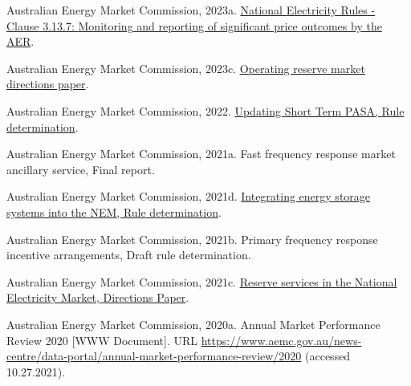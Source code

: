 \documentclass[12pt,a4paper,]{report}
\newlength{\cslhangindent}
\newenvironment{CSLReferences}[2] %
 {%
  \setlength{\parindent}{0pt}
  \ifodd #1 \everypar{\setlength{\hangindent}{\cslhangindent}}\ignorespaces\fi
  \ifnum #2 > 0
  \setlength{\parskip}{#2\baselineskip}
  \fi
 }%
 {}
\begin{document}
\begin{CSLReferences}{1}{0}
\leavevmode{}%
Australian Energy Market Commission, 2023a.
\href{https://energy-rules.aemc.gov.au/ner/477/272353\#3.13.7}{National
{Electricity Rules} - {Clause} 3.13.7: {Monitoring} and reporting of
significant price outcomes by the {AER}}.

\leavevmode{}%
Australian Energy Market Commission, 2023c.
\href{https://www.aemc.gov.au/sites/default/files/2023-08/directions_paper_2023_0.pdf}{Operating
reserve market directions paper}.

\leavevmode{}%
Australian Energy Market Commission, 2022.
\href{https://www.aemc.gov.au/sites/default/files/2022-05/ERC0332\%20-\%20Updating\%20Short\%20Term\%20PASA\%20-\%20Final\%20determination.pdf}{Updating
{Short Term PASA}, {Rule} determination}.

\leavevmode{}%
Australian Energy Market Commission, 2021a. Fast frequency response
market ancillary service, {Final} report.

\leavevmode{}%
Australian Energy Market Commission, 2021d.
\href{https://www.aemc.gov.au/sites/default/files/2021-12/1._final_determination_-_integrating_energy_storage_systems_into_the_nem.pdf}{Integrating
energy storage systems into the {NEM}, {Rule} determination}.

\leavevmode{}%
Australian Energy Market Commission, 2021b. Primary frequency response
incentive arrangements, {Draft} rule determination.

\leavevmode{}%
Australian Energy Market Commission, 2021c.
\href{https://www.aemc.gov.au/sites/default/files/2021-01/Reserve\%20services\%20directions\%20paper\%20-\%205.01.2021\%20-\%20FINAL.pdf}{Reserve
services in the {National Electricity Market}, {Directions Paper}}.

\leavevmode{}%
Australian Energy Market Commission, 2020a. Annual {Market Performance
Review} 2020 {[}WWW Document{]}. URL
\url{https://www.aemc.gov.au/news-centre/data-portal/annual-market-performance-review/2020}
(accessed 10.27.2021).


\end{CSLReferences}
\end{document}
